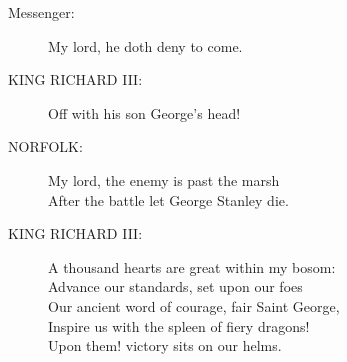 \documentclass{article}
\begin{document}
\begin{description}
\item[Messenger:] 
\hspace{1pt}My lord, he doth deny to come.\\
\end{description}
\begin{description}
\item[KING RICHARD III:] 
\hspace{1pt}Off with his son George's head!\\
\end{description}
\begin{description}
\item[NORFOLK:] 
\hspace{1pt}My lord, the enemy is past the marsh\\
\hspace{1pt}After the battle let George Stanley die.\\
\end{description}
\begin{description}
\item[KING RICHARD III:] 
\hspace{1pt}A thousand hearts are great within my bosom:\\
\hspace{1pt}Advance our standards, set upon our foes\\
\hspace{1pt}Our ancient word of courage, fair Saint George,\\
\hspace{1pt}Inspire us with the spleen of fiery dragons!\\
\hspace{1pt}Upon them! victory sits on our helms.\\
\end{description}
\centering{\it [Exeunt]}\\
\end{document}
